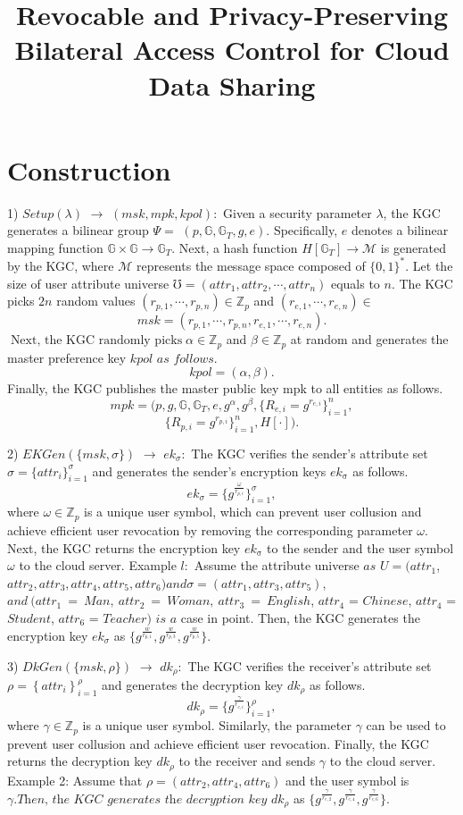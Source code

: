 \documentclass[runningheads]{llncs}
\begin{document}
\title{Revocable and Privacy-Preserving Bilateral Access Control for Cloud Data Sharing}

\section{Construction}
1) $\textit{Setup}( \lambda )$ $\to$ $( msk, mpk, kpol) {: }$ Given a security parameter $\lambda$, the KGC generates a bilinear group $\Psi=$ $(p,\mathbb{G},\mathbb{G}_T,g,e).$ Specifically, $e$ denotes a bilinear mapping function $\mathbb{G}\times\mathbb{G}\to\mathbb{G}_T.$ Next, a hash function $H[\mathbb{G}_T]\to\mathcal{M}$ is generated by the KGC, where $\mathcal{M}$ represents the message space composed of $\{0,1\}^*.$ Let the size of user attribute universe $\mho=(attr_1,attr_2,\cdots,attr_n)$ equals to $n.$ The KGC picks $2n$ random values $(r_{p,1},\cdots,r_{p,n})\in\mathbb{Z}_p$ and $(r_{e,1},\cdots,r_{e,n})\in$
$$msk=(r_{p,1},\cdots,r_{p,n},r_{e,1},\cdots,r_{e,n}).$$
$\operatorname*{Next,\text{ the KGC randomly picks }}\alpha\in\mathbb{Z}_p$ and $\beta\in\mathbb{Z}_p$ at random
and generates the master preference key $k\textit{pol as follows. }$
$$kpol=(\alpha,\beta).$$
Finally, the KGC publishes the master public key mpk to all entities as follows.
$$mpk=(p,g,\mathbb{G},\mathbb{G}_T,e,g^\alpha,g^\beta,\{R_{e,i}=g^{r_{e,i}}\}_{i=1}^n,$$
$$\{R_{p,i}=g^{r_{p,i}}\}_{i=1}^n,H[\cdot]).$$

2) $EKGen( \{ msk, \sigma \} )$ $\to$ $ek_\sigma {: }$ The KGC verifies the sender's attribute set $\sigma=\{attr_i\}_{i=1}^\sigma$ and generates the sender's encryption keys $ek_\mathrm{\sigma}$ as follows.
$$ek_\sigma=\{g^{\frac\omega{r_{p,i}}}\}_{i=1}^\sigma,$$
where $\omega\in\mathbb{Z}_p$ is a unique user symbol, which can prevent user collusion and achieve efficient user revocation by removing the corresponding parameter $\omega.$ Next, the KGC returns the encryption key $ek_\mathrm{\sigma}$ to the sender and the user symbol $\omega$ to the cloud server.
Example $l:$ Assume the attribute universe $as$ $U= ( attr_1$, $attr_{2},attr_{3},attr_{4},attr_{5},attr_{6})and\sigma=(attr_{1},attr_{3},attr_{5})$, $and~(attr_{1}~=~Man,~attr_{2}~=~Woman,~attr_{3}~=~English$, $attr_{4}$ = $Chinese$, $attr_{4}$ = $Student$, $attr_{6}$ = $Teacher)$ $is$ $a$ case in point. Then, the KGC generates the encryption key $ek_{\sigma}$ as $\{g^{\frac{w}{r_{p,1}}},g^{\frac{w}{r_{p,3}}},g^{\frac{w}{r_{p,5}}}\}.$

3) $DkGen( \{ msk, \rho \} )$ $\to$ $dk_\rho {: }$ The KGC verifies the receiver's attribute set $\rho=\left\{attr_i\right\}_{i=1}^\rho$ and generates the decryption key $dk_\rho$ as follows.
$$dk_\rho=\{g^{\frac\gamma{r_{e,i}}}\}_{i=1}^\rho,$$
where $\gamma\in\mathbb{Z}_p$ is a unique user symbol. Similarly, the parameter $\gamma$ can be used to prevent user collusion and achieve efficient user revocation. Finally, the KGC returns the decryption key $dk_\rho$ to the receiver and sends $\gamma$ to the cloud server.
Example 2: Assume that $\rho = ( attr_{2}, attr_{4}, attr_{6})$ and the user symbol is $\gamma . \textit{Then, the KGC generates the decryption key}$ $dk_{\rho}$ as $\{g^\frac\gamma{r_{e,2}},g^{\frac\gamma{r_{e,4}}},g^{\frac\gamma{r_{e,6}}}\}.$
\end{document}
